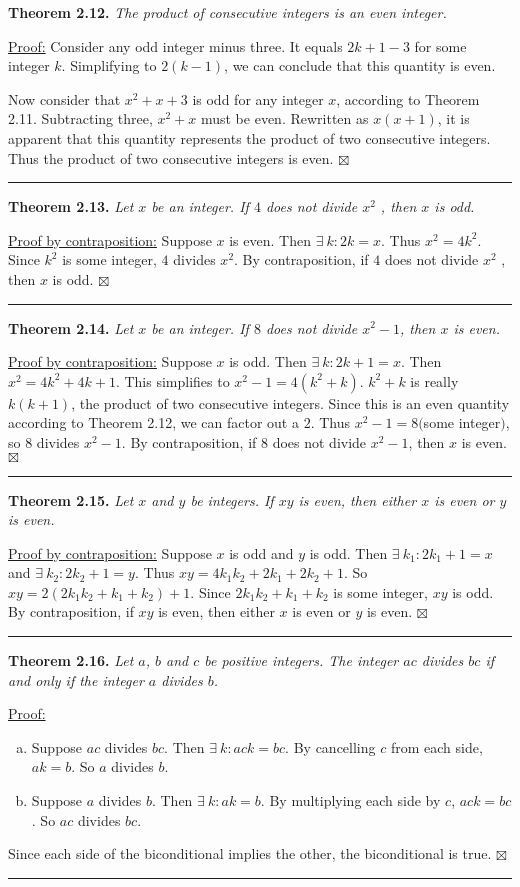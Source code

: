 \documentclass[a4paper,12pt]{article}
\newcommand{\entry}[3]
{
   \noindent\textbf{#1.}
   \emph{#2}
   \bigskip

   \noindent#3
   \bigskip
   \hrule
   \vspace{24pt}
}
\newcommand{\sig}{$\boxtimes$}
\begin{document}
\entry{Theorem 2.12}
{The product of consecutive integers is an even integer.}
{
\underline{Proof:} Consider any odd integer minus three. It equals $2k + 1 - 3$ for some integer $k$. Simplifying to $2(k - 1)$, we can conclude that this quantity is even. 

Now consider that $x^2 + x + 3$ is odd for any integer $x$, according to Theorem 2.11. Subtracting three, $x^2 + x$ must be even. Rewritten as $x(x + 1)$, it is apparent that this quantity represents the product of two consecutive integers. Thus the product of two consecutive integers is even. \sig
}



\entry{Theorem 2.13}
{Let $x$ be an integer. If $4$ does not divide $x^2$ , then $x$ is odd.}
{
\underline{Proof by contraposition:} Suppose $x$ is even. Then $\exists~k : 2k = x$. Thus $x^2 = 4k^2$. Since $k^2$ is some integer, $4$ divides $x^2$. By contraposition, if $4$ does not divide $x^2$ , then $x$ is odd. \sig
}



\entry{Theorem 2.14}
{Let $x$ be an integer. If $8$ does not divide $x^2 - 1$, then $x$ is even.}
{
\underline{Proof by contraposition:} Suppose $x$ is odd. Then $\exists~k : 2k + 1 = x$. Then $x^2 = 4k^2 + 4k + 1$. This simplifies to $x^2 - 1 = 4(k^2 + k)$. $k^2 + k$ is really $k(k + 1)$, the product of two consecutive integers. Since this is an even quantity according to Theorem 2.12, we can factor out a $2$. Thus $x^2 - 1 = 8($some integer$)$, so $8$ divides $x^2 - 1$. By contraposition, if $8$ does not divide $x^2 - 1$, then $x$ is even. \sig
}



\entry{Theorem 2.15}
{Let $x$ and $y$ be integers. If $xy$ is even, then either $x$ is even or $y$ is even.}
{
\underline{Proof by contraposition:} Suppose $x$ is odd and $y$ is odd. Then $\exists~k_1 : 2k_1 + 1 = x$ and $\exists~k_2 : 2k_2 + 1 = y$. Thus $xy = 4k_{1}k_2 + 2k_1 + 2k_2 + 1$. So $xy = 2(2k_{1}k_2 + k_1 + k_2) + 1$. Since $2k_{1}k_2 + k_1 + k_2$ is some integer, $xy$ is odd. By contraposition, if $xy$ is even, then either $x$ is even or $y$ is even. \sig
}


\entry{Theorem 2.16}
{Let $a$, $b$ and $c$ be positive integers. The integer $ac$ divides $bc$ if and only if the integer $a$ divides $b$.}
{
\underline{Proof:}
\begin{enumerate}[(a)]
\item
Suppose $ac$ divides $bc$. Then $\exists~k : ack = bc$. By cancelling $c$ from each side, $ak = b$. So $a$ divides $b$.
\item
Suppose $a$ divides $b$. Then $\exists~k : ak = b$. By multiplying each side by $c$, $ack = bc$. So $ac$ divides $bc$.
\end{enumerate}
Since each side of the biconditional implies the other, the biconditional is true. \sig
}
\end{document}
